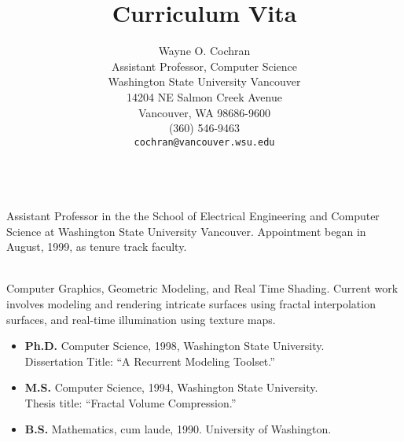 \documentclass[12pt]{article}
\title{Curriculum Vita}
\author{Wayne O. Cochran\\
       Assistant Professor, Computer Science\\
       Washington State University Vancouver\\
       14204 NE Salmon Creek Avenue\\
       Vancouver, WA 98686-9600\\
       (360) 546-9463\\
       {\tt cochran@vancouver.wsu.edu}}
\begin{document}
\maketitle

\\

Assistant Professor in the the School of Electrical Engineering and 
Computer Science at Washington State University Vancouver. 
Appointment began
in August, 1999, as tenure track faculty.

\vspace{0.5cm}

\\

Computer Graphics, Geometric Modeling, and Real Time Shading.
Current work involves modeling and rendering intricate surfaces
using fractal interpolation surfaces, and real-time illumination
using texture maps.

\vspace{0.5cm}


\begin{itemize}
\item {\bf Ph.D.} Computer Science, 1998,
Washington State University. \\
Dissertation Title: ``A Recurrent Modeling Toolset.''

\item {\bf M.S.} Computer Science, 1994,
Washington State University. \\
Thesis title: ``Fractal Volume Compression.''

\item {\bf B.S.} Mathematics, cum laude, 1990.
University of Washington. 
\end{itemize}

\vspace{0.25cm}

\end{document}
